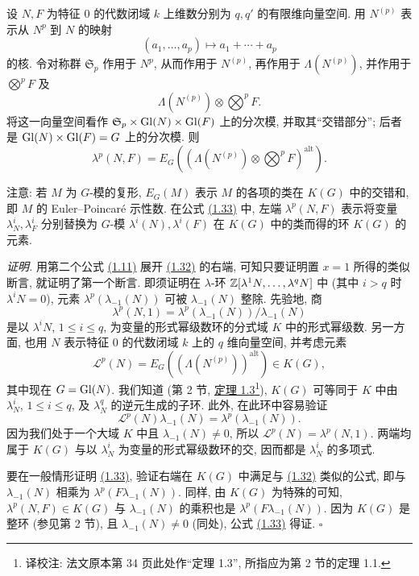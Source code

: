 设 $N,F$ 为特征 $0$ 的代数闭域 $k$ 上维数分别为 $q,q'$ 的有限维向量空间. 用 $N^{(p)}$ 表示从 $N^p$ 到 $N$ 的映射
\[
(a_1,\ldots,a_p)\longmapsto a_1+\cdots+a_p
\]
的核. 令对称群 $\mathfrak S_p$ 作用于 $N^p$, 从而作用于 $N^{(p)}$, 再作用于 $\Lambda(N^{(p)})$, 并作用于 $\bigotimes^p F$ 及
\[
\Lambda(N^{(p)})\otimes\bigotimes^p F.
\]
将这一向量空间看作 $\mathfrak S_p\times\operatorname{Gl}(N)\times\operatorname{Gl}(F)$ 上的分次模, 并取其“交错部分”; 后者是 $\operatorname{Gl}(N)\times\operatorname{Gl}(F)=G$ 上的分次模. 则
\begin{equation}\tag{1.33}
\lambda^p(N,F)=E_G\left(\left(\Lambda(N^{(p)})\otimes\bigotimes^p F\right)^{\mathrm{alt}}\right).
\end{equation}

注意: 若 $M$ 为 $G$-模的复形, $E_G(M)$ 表示 $M$ 的各项的类在 $K(G)$ 中的交错和, 即 $M$ 的 Euler--Poincaré 示性数. 在公式 \hyperlink{sga6.e00.eq.1-33}{(1.33)} 中, 左端 $\lambda^p(N,F)$ 表示将变量 $\lambda^i_N,\lambda^i_F$ 分别替换为 $G$-模 $\lambda^i(N),\lambda^i(F)$ 在 $K(G)$ 中的类而得的环 $K(G)$ 的元素.

\emph{证明.} 用第二个公式 \hyperlink{sga6.e00.eq.1-11}{(1.11)} 展开 \hyperlink{sga6.e00.eq.1-32}{(1.32)} 的右端, 可知只要证明置 $x=1$ 所得的类似断言, 就证明了第一个断言. 即须证明在 $\lambda$-环 $\mathbb Z[\lambda^1N,\ldots,\lambda^qN]$ 中 (其中 $i>q$ 时 $\lambda^iN=0$), 元素 $\lambda^p(\lambda_{-1}(N))$ 可被 $\lambda_{-1}(N)$ 整除. 先验地, 商
\[
\lambda^p(N,1)=\lambda^p(\lambda_{-1}(N))/\lambda_{-1}(N)
\]
是以 $\lambda^iN$, $1\leq i\leq q$, 为变量的形式幂级数环的分式域 $K$ 中的形式幂级数. 另一方面, 也用 $N$ 表示特征 $0$ 的代数闭域 $k$ 上的 $q$ 维向量空间, 并考虑元素
\[
\mathscr L^p(N)=E_G((\Lambda(N^{(p)}))^{\mathrm{alt}})\in K(G),
\]
其中现在 $G=\operatorname{Gl}(N)$. 我们知道 (第 2 节, \hyperlink{sga6.e00.thm.1-1}{定理 1.3}\footnote{译校注: 法文原本第 34 页此处作“定理 1.3”, 所指应为第 2 节的定理 1.1.}), $K(G)$ 可等同于 $K$ 中由 $\lambda^i_N$, $1\leq i\leq q$, 及 $\lambda_N^q$ 的逆元生成的子环. 此外, 在此环中容易验证
\[
\mathscr L^p(N)\lambda_{-1}(N)=\lambda^p(\lambda_{-1}(N)).
\]
因为我们处于一个大域 $K$ 中且 $\lambda_{-1}(N)\ne0$, 所以 $\mathscr L^p(N)=\lambda^p(N,1)$. 两端均属于 $K(G)$ 与以 $\lambda_N^i$ 为变量的形式幂级数环的交, 因而都是 $\lambda_N^i$ 的多项式.

要在一般情形证明 \hyperlink{sga6.e00.eq.1-33}{(1.33)}, 验证右端在 $K(G)$ 中满足与 \hyperlink{sga6.e00.eq.1-32}{(1.32)} 类似的公式, 即与 $\lambda_{-1}(N)$ 相乘为 $\lambda^p(F\lambda_{-1}(N))$. 同样, 由 $K(G)$ 为特殊的可知, $\lambda^p(N,F)\in K(G)$ 与 $\lambda_{-1}(N)$ 的乘积也是 $\lambda^p(F\lambda_{-1}(N))$. 因为 $K(G)$ 是整环 (参见第 2 节), 且 $\lambda_{-1}(N)\ne0$ (同处), 公式 \hyperlink{sga6.e00.eq.1-33}{(1.33)} 得证. \hfill$\square$

